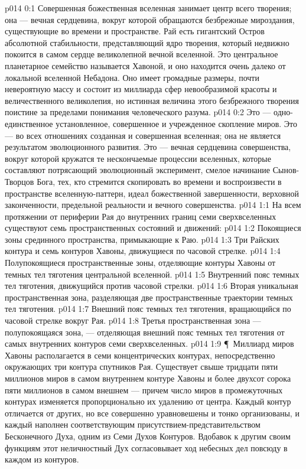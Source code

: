 \vs p014 0:1 Совершенная божественная вселенная занимает центр всего творения; она --- вечная сердцевина, вокруг которой обращаются безбрежные мироздания, существующие во времени и пространстве. Рай есть гигантский Остров абсолютной стабильности, представляющий ядро творения, который недвижно покоится в самом сердце великолепной вечной вселенной. Это центральное планетарное семейство называется Хавоной, и оно находится очень далеко от локальной вселенной Небадона. Оно имеет громадные размеры, почти невероятную массу и состоит из миллиарда сфер невообразимой красоты и величественного великолепия, но истинная величина этого безбрежного творения поистине за пределами понимания человеческого разума.
\vs p014 0:2 Это --- одно\hyp{}единственное установленное, совершенное и учрежденное скопление миров. Это --- во всех отношениях созданная и совершенная вселенная; она не является результатом эволюционного развития. Это --- вечная сердцевина совершенства, вокруг которой кружатся те нескончаемые процессии вселенных, которые составляют потрясающий эволюционный эксперимент, смелое начинание Сынов\hyp{}Творцов Бога, тех, кто стремится скопировать во времени и воспроизвести в пространстве вселенную\hyp{}паттерн, идеал божественной завершенности, верховной законченности, предельной реальности и вечного совершенства.
\vs p014 1:1 На всем протяжении от периферии Рая до внутренних границ семи сверхвселенных существуют семь пространственных состояний и движений:
\vs p014 1:2 \bibnobreakspace Покоящиеся зоны срединного пространства, примыкающие к Раю.
\vs p014 1:3 \bibnobreakspace Три Райских контура и семь контуров Хавоны, движущиеся по часовой стрелке.
\vs p014 1:4 \bibnobreakspace Полупокоящиеся пространственные зоны, отделяющие контуры Хавоны от темных тел тяготения центральной вселенной.
\vs p014 1:5 \bibnobreakspace Внутренний пояс темных тел тяготения, движущийся против часовой стрелки.
\vs p014 1:6 \bibnobreakspace Вторая уникальная пространственная зона, разделяющая две пространственные траектории темных тел тяготения.
\vs p014 1:7 \bibnobreakspace Внешний пояс темных тел тяготения, вращающийся по часовой стрелке вокруг Рая.
\vs p014 1:8 \bibnobreakspace Третья пространственная зона --- полупокоящаяся зона, --- отделяющая внешний пояс темных тел тяготения от самых внутренних контуров семи сверхвселенных.
\vs p014 1:9 \P\ Миллиард миров Хавоны располагается в семи концентрических контурах, непосредственно окружающих три контура спутников Рая. Существует свыше тридцати пяти миллионов миров в самом внутреннем контуре Хавоны и более двухсот сорока пяти миллионов в самом внешнем --- причем число миров в промежуточных контурах изменяется пропорционально их удалению от центра. Каждый контур отличается от других, но все совершенно уравновешены и тонко организованы, и каждый наполнен соответствующим присутствием\hyp{}представительством Бесконечного Духа, одним из Семи Духов Контуров. Вдобавок к другим своим функциям этот неличностный Дух согласовывает ход небесных дел повсюду в каждом из контуров.
